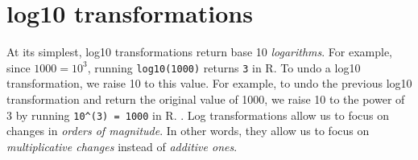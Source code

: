 \documentclass[
  12pt,
  a4paper,
  oneside]{book}
\begin{document}
\hypertarget{appendix-log10-transformations}{%
\section{log10 transformations}\label{appendix-log10-transformations}}

At its simplest, log10 transformations return base 10 \emph{logarithms}. For example, since \(1000 = 10^3\), running \texttt{log10(1000)} returns \texttt{3} in R. To undo a log10 transformation, we raise 10 to this value. For example, to undo the previous log10 transformation and return the original value of 1000, we raise 10 to the power of 3 by running \texttt{10\^{}(3)\ =\ 1000} in R. . Log transformations allow us to focus on changes in \emph{orders of magnitude}. In other words, they allow us to focus on \emph{multiplicative changes} instead of \emph{additive ones}.

  

\printindex
\end{document}
